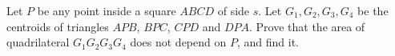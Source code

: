 Let $P$ be any point inside a square $ABCD$ of side $s$. Let $G_1,G_2,G_3,G_4$ be the centroids of triangles $APB$, $BPC$, $CPD$ and $DPA$. Prove that the area of quadrilateral $G_1G_2G_3G_4$ does not depend on $P$, and find it.
